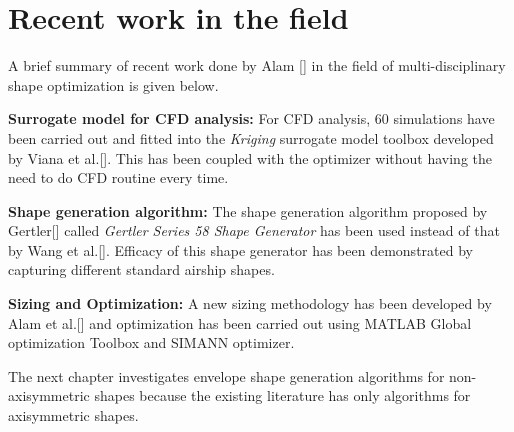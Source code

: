 \section{Recent work in the field}

A brief summary of recent work done by Alam [] in the field of multi-disciplinary shape optimization is given below. 

\textbf{Surrogate model for CFD analysis:}
For CFD analysis, 60 simulations have been carried out and fitted into the \textit{Kriging} surrogate model toolbox developed by Viana et al.[]. This has been coupled with the optimizer without having the need to do CFD routine every time.

\textbf{Shape generation algorithm:}
The shape generation algorithm proposed by Gertler[] called \textit{Gertler Series 58 Shape Generator} has been used instead of that by Wang et al.[]. Efficacy of this shape generator has been demonstrated by capturing different standard airship shapes. 

\textbf{Sizing and Optimization:} 
A new sizing methodology has been developed by Alam et al.[] and optimization has been carried out using MATLAB Global optimization Toolbox and SIMANN optimizer.

The next chapter investigates envelope shape generation algorithms for non-axisymmetric shapes because the existing literature has only algorithms for axisymmetric shapes. 





